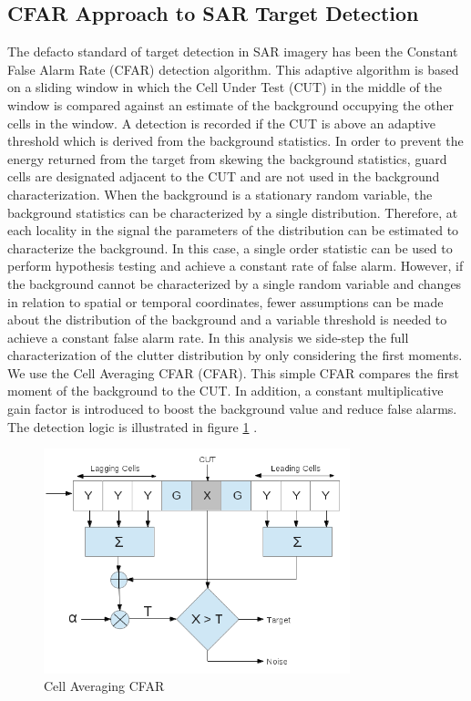 \documentclass[journal]{IEEEtran}
\begin{document}
\subsection{CFAR Approach to SAR Target Detection}
\par The defacto standard of target detection in SAR imagery has been the Constant False Alarm Rate (CFAR) detection algorithm. This adaptive algorithm is based on a sliding window in which the Cell Under Test (CUT) in the middle of the window is compared against an estimate of the background occupying the other cells in the window. A detection is recorded if the CUT is above an adaptive threshold which is derived from the background statistics. In order to prevent the energy returned from the target from skewing the background statistics, guard cells are designated adjacent to the CUT and are not used in the background characterization. When the background is a stationary random variable, the background statistics can be characterized by a single distribution. Therefore, at each locality in the signal the parameters of the distribution can be estimated to characterize the background. In this case, a single order statistic can be used to perform hypothesis testing and achieve a constant rate of false alarm. However, if the background cannot be characterized by a single random variable and changes in relation to spatial or temporal coordinates, fewer assumptions can be made about the distribution of the background and a variable threshold is needed to achieve a constant false alarm rate. In this analysis we side-step the full characterization of the clutter distribution by only considering the first moments. We use the Cell Averaging CFAR (CFAR). This simple CFAR compares the first moment of the background to the CUT. In addition, a constant multiplicative gain factor is introduced to boost the background value and reduce false alarms. The detection logic is illustrated in figure \ref{fig:cfar} \cite[p.~392-395]{skolnik}.

\begin{figure}[!h]
\centering
\includegraphics[width=3.5in]{../images/cacfar2.png}
\caption{Cell Averaging CFAR}
\label{fig:cfar}
\end{figure}
\end{document}
